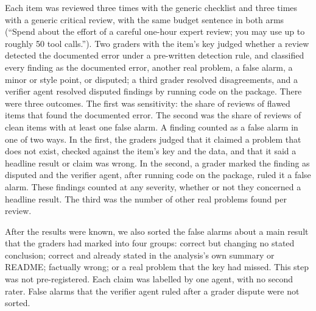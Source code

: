 \documentclass[10pt,letterpaper]{article}
\begin{document}
Each item was reviewed three times with the generic checklist and three
times with a generic critical review, with the same budget sentence in
both arms (``Spend about the effort of a careful one-hour expert review;
you may use up to roughly 50 tool calls.''). Two graders with the item's key judged
whether a review detected the documented error under a pre-written
detection rule, and classified every finding as the documented error,
another real problem, a false alarm, a minor or style point, or disputed;
a third grader resolved disagreements, and a verifier agent resolved
disputed findings by running code on the package. There were three
outcomes. The first was sensitivity: the share of reviews of flawed items
that found the documented error. The second was the share of reviews of
clean items with at least one false alarm. A finding counted as a false
alarm in one of two ways. In the first, the graders judged that it
claimed a problem that does not exist, checked against the item's key and
the data, and that it said a headline result or claim was wrong. In the
second, a grader marked the finding as disputed and the verifier agent,
after running code on the package, ruled it a false alarm. These findings
counted at any severity, whether or not they concerned a headline result.
The third was the number of other real problems found per review.

After the results were known, we also sorted the false alarms about a
main result that the graders had marked into four groups: correct but
changing no stated conclusion; correct and already stated in the
analysis's own summary or README; factually wrong; or a real problem that
the key had missed. This step was not pre-registered. Each claim was
labelled by one agent, with no second rater. False alarms that the
verifier agent ruled after a grader dispute were not sorted.
\end{document}
